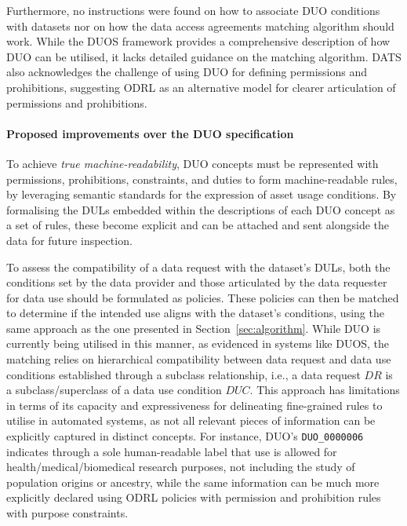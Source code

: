 Furthermore, no instructions were found on how to associate DUO conditions with datasets nor on how the data access agreements matching algorithm should work.
While the DUOS framework provides a comprehensive description of how DUO can be utilised, it lacks detailed guidance on the matching algorithm.
DATS \citep{alter_data_2020} also acknowledges the challenge of using DUO for defining permissions and prohibitions, suggesting ODRL as an alternative model for clearer articulation of permissions and prohibitions.

\paragraph{Proposed improvements over the DUO specification}
To achieve \textit{true machine-readability}, DUO concepts must be represented with permissions, prohibitions, constraints, and duties to form machine-readable rules, by leveraging semantic standards for the expression of asset usage conditions.
By formalising the DULs embedded within the descriptions of each DUO concept as a set of rules, these become explicit and can be attached and sent alongside the data for future inspection.

To assess the compatibility of a data request with the dataset's DULs, both the conditions set by the data provider and those articulated by the data requester for data use should be formulated as policies.
These policies can then be matched to determine if the intended use aligns with the dataset's conditions, using the same approach as the one presented in Section~\ref{sec:algorithm}.
While DUO is currently being utilised in this manner, as evidenced in systems like DUOS, the matching relies on hierarchical compatibility between data request and data use conditions established through a subclass relationship, i.e., a data request $DR$ is a subclass/superclass of a data use condition $DUC$.
This approach has limitations in terms of its capacity and expressiveness for delineating fine-grained rules to utilise in automated systems, as not all relevant pieces of information can be explicitly captured in distinct concepts.
For instance, DUO's \texttt{DUO\_0000006} indicates through a sole human-readable label that use is allowed for health/medical/biomedical research purposes, not including the study of population origins or ancestry, while the same information can be much more explicitly declared using ODRL policies with permission and prohibition rules with purpose constraints.

